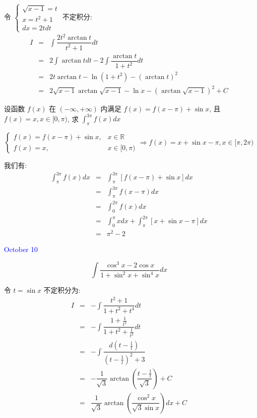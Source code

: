 \begin{solution}

	令 $
	\begin{cases}
		\sqrt{x-1} = t\\
		x = t^{2} + 1\\
		dx = 2tdt
	\end{cases}$ 不定积分:  
	\begin{eqnarray*}
		I & = & \int \dfrac{2t^2\arctan t}{t^2+1}dt\\
		  & = & 2\int \arctan tdt-2\int\dfrac{\arctan t}{1+t^2}dt\\
		  & = & 2t\arctan t-\ln(1+t^2)-(\arctan t)^2\\
		  & = & 2\sqrt{x-1}\arctan \sqrt{x-1}-\ln x-(\arctan\sqrt{x-1})^2+C
	\end{eqnarray*}
\end{solution}

\begin{example}[][Exam: 36.2.4]
	设函数 $f(x)$ 在 $(-\infty,+\infty)$ 内满足 $f(x)=f(x-\pi)+\sin x$, 且 $f(x)=x,x\in[0,\pi)$, 求 $\displaystyle{\int_{\pi}^{3\pi}f(x)dx}$
\end{example}

\begin{solution}

	$$\begin{cases}
		f(x) = f(x-\pi)+\sin x, & x\in \mathbb{R}\\
		f(x) = x, &x\in[0,\pi)
	\end{cases}  
	\Rightarrow
	f(x) = x+\sin x-\pi,x\in[\pi,2\pi)$$
	
	我们有:  
	\begin{eqnarray*}
		\int_{\pi}^{3\pi}f(x)dx & = & \int_{\pi}^{3\pi}[f(x-\pi)+\sin x]dx\\
								& = & \int_{\pi}^{3\pi}f(x-\pi)dx\\
								& = & \int_{0}^{2\pi}f(x)dx\\
								& = & \int_{0}^{\pi}xdx+\int_{\pi}^{2\pi}[x+\sin x-\pi]dx\\
								& = & \pi^2-2
	\end{eqnarray*}
\end{solution}


\textcolor{blue}{October 10}

\begin{example}[][Exam: 36.2.5]
	$$\int \dfrac{\cos^3 x-2\cos x}{1+\sin^2 x+\sin^4 x}dx$$
\end{example}

\begin{solution}

	令 $t=\sin x$ 不定积分为:  
	\begin{eqnarray*}
		I & = & -\int \dfrac{t^2+1}{1+t^2+t^4}dt\\
		  & = & -\int \dfrac{1+\frac{1}{t^2}}{1+t^2+\frac{1}{t^2}}dt\\
		  & = & -\int \dfrac{d(t-\frac{1}{t})}{(t-\frac{1}{t})^2+3}\\
		  & = & -\dfrac{1}{\sqrt{3}}\arctan(\dfrac{t-\frac{1}{t}}{\sqrt{3}})+C\\
		  & = & \dfrac{1}{\sqrt{3}}\arctan(\dfrac{\cos^2 x}{\sqrt{3}\sin x})dx+C
	\end{eqnarray*}
\end{solution}

